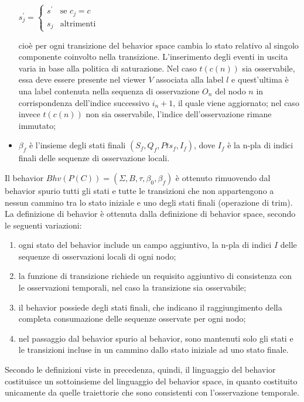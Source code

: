 \begin{defn}
\begin{itemize}
\begin{center}
$s^\prime_j = \begin{cases} s^\prime & \mbox{se }c_j = c\\ s_j & \mbox{altrimenti} \end{cases}$
\end{center}
cioè per ogni transizione del behavior space cambia lo stato relativo al singolo componente coinvolto nella transizione.
L'inserimento degli eventi in uscita varia in base alla politica di saturazione.
Nel caso $t(c(n))$ sia osservabile, essa deve essere presente nel viewer $V$ associata alla label $l$ e quest'ultima è una label contenuta nella sequenza di osservazione $O_n$ del nodo $n$ in corrispondenza dell'indice successivo $i_n+1$, il quale viene aggiornato; nel caso invece $t(c(n))$ non sia osservabile, l'indice dell'osservazione rimane immutato;
\item $\beta_f$ è l'insieme degli stati finali $(S_f,Q_f,Pts_f,I_f)$, dove $I_f$ è la n-pla di indici finali delle sequenze di osservazione locali.
\end{itemize}
\end{defn}

Il behavior $Bhv(P(C)) = (\Sigma,B,\tau,\beta_0,\beta_f)$ è ottenuto rimuovendo dal behavior spurio tutti gli stati e tutte le transizioni che non appartengono a nessun cammino tra lo stato iniziale e uno degli stati finali (operazione di trim).
La definizione di behavior è ottenuta dalla definizione di behavior space, secondo le seguenti variazioni:
\begin{enumerate}
\item ogni stato del behavior include un campo aggiuntivo, la n-pla di indici $I$ delle sequenze di osservazioni locali di ogni nodo;
\item la funzione di transizione richiede un requisito aggiuntivo di consistenza con le osservazioni temporali, nel caso la transizione sia osservabile;
\item il behavior possiede degli stati finali, che indicano il raggiungimento della completa consumazione delle sequenze osservate per ogni nodo;
\item nel passaggio dal behavior spurio al behavior, sono mantenuti solo gli stati e le transizioni incluse in un cammino dallo stato iniziale ad uno stato finale.
\end{enumerate}
Secondo le definizioni viste in precedenza, quindi, il linguaggio del behavior costituisce un sottoinsieme del linguaggio del behavior space, in quanto costituito unicamente da quelle traiettorie che sono consistenti con l'osservazione temporale.

